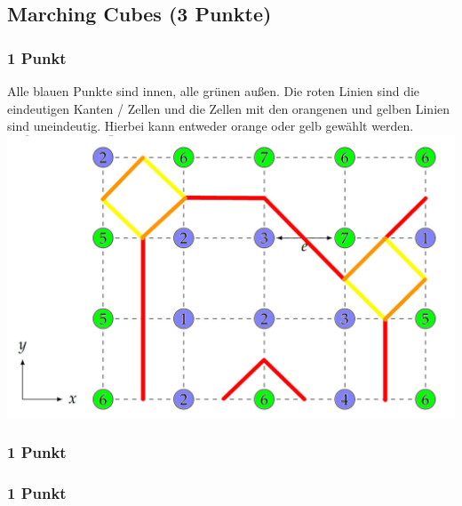 \newif\ifvimbug
\vimbugfalse

\ifvimbug

\fi


\subsection{Marching Cubes (3 Punkte)}
\subsubsection{1 Punkt}
Alle blauen Punkte sind innen, alle grünen außen. Die roten Linien sind die eindeutigen Kanten / Zellen und die Zellen mit den orangenen und gelben Linien sind uneindeutig. Hierbei kann entweder orange oder gelb gewählt werden. \\
\includegraphics[width=(\textwidth/2)]{51a.jpg} 
\subsubsection{1 Punkt}
\subsubsection{1 Punkt}